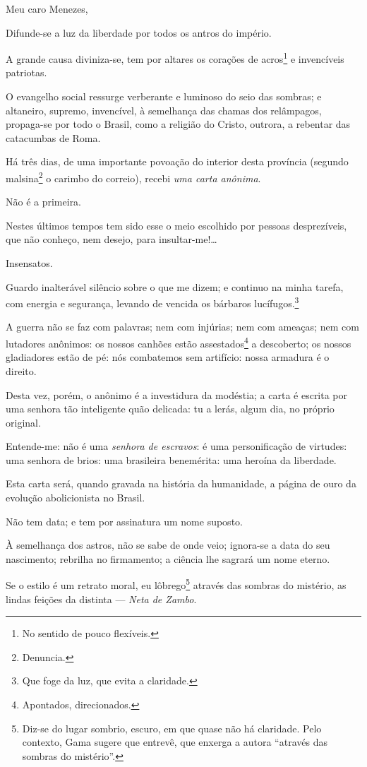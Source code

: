 Meu caro Menezes,

Difunde-se a luz da liberdade por todos os antros do império.

A grande causa diviniza-se, tem por altares os corações de
acros\footnote{No sentido de pouco flexíveis.} e invencíveis
patriotas.

O evangelho social ressurge verberante e luminoso do seio das sombras; e
altaneiro, supremo, invencível, à semelhança das chamas dos relâmpagos,
propaga-se por todo o Brasil, como a religião do Cristo, outrora, a
rebentar das catacumbas de Roma.

Há três dias, de uma importante povoação do interior desta província
(segundo malsina\footnote{Denuncia.} o carimbo do correio), recebi
\emph{uma carta anônima}.

Não é a primeira.

Nestes últimos tempos tem sido esse o meio escolhido por pessoas
desprezíveis, que não conheço, nem desejo, para insultar-me!\ldots{}

Insensatos.

Guardo inalterável silêncio sobre o que me dizem; e continuo na minha
tarefa, com energia e segurança, levando de vencida os bárbaros
lucífugos.\footnote{Que foge da luz, que evita a claridade.}

A guerra não se faz com palavras; nem com injúrias; nem com ameaças; nem
com lutadores anônimos: os nossos canhões estão assestados\footnote{
  Apontados, direcionados.} a descoberto; os nossos gladiadores estão de
pé: nós combatemos sem artifício: nossa armadura é o direito.

Desta vez, porém, o anônimo é a investidura da modéstia; a carta é
escrita por uma senhora tão inteligente quão delicada: tu a lerás, algum
dia, no próprio original.

Entende-me: não é uma \emph{senhora de escravos}: é uma personificação
de virtudes: uma senhora de brios: uma brasileira benemérita: uma
heroína da liberdade.

Esta carta será, quando gravada na história da humanidade, a página de
ouro da evolução abolicionista no Brasil.

Não tem data; e tem por assinatura um nome suposto.

À semelhança dos astros, não se sabe de onde veio; ignora-se a data do
seu nascimento; rebrilha no firmamento; a ciência lhe sagrará um nome
eterno.

Se o estilo é um retrato moral, eu lôbrego\footnote{Diz-se do lugar
  sombrio, escuro, em que quase não há claridade. Pelo contexto, Gama
  sugere que entrevê, que enxerga a autora ``através das sombras do
  mistério''.} através das sombras do mistério, as lindas feições da
distinta --- \emph{Neta de Zambo}.

